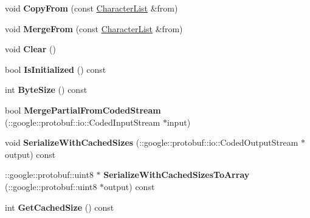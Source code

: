 \begin{DoxyCompactItemize}
\item 
void {\bfseries Copy\+From} (const \hyperlink{classCharacterList}{Character\+List} \&from)\hypertarget{classCharacterList_a562784317ca1d5a8a2f5d2e5c8dd4d91}{}\label{classCharacterList_a562784317ca1d5a8a2f5d2e5c8dd4d91}

\item 
void {\bfseries Merge\+From} (const \hyperlink{classCharacterList}{Character\+List} \&from)\hypertarget{classCharacterList_add64558c620d8c5e8e45dfbd90d4b286}{}\label{classCharacterList_add64558c620d8c5e8e45dfbd90d4b286}

\item 
void {\bfseries Clear} ()\hypertarget{classCharacterList_ad24a5a0cbd565eb9149c08f1decad097}{}\label{classCharacterList_ad24a5a0cbd565eb9149c08f1decad097}

\item 
bool {\bfseries Is\+Initialized} () const \hypertarget{classCharacterList_aed2311adb28f5438cb82a508bd42145a}{}\label{classCharacterList_aed2311adb28f5438cb82a508bd42145a}

\item 
int {\bfseries Byte\+Size} () const \hypertarget{classCharacterList_a4c6f0118b6b28a797f70d015c44d20b5}{}\label{classCharacterList_a4c6f0118b6b28a797f70d015c44d20b5}

\item 
bool {\bfseries Merge\+Partial\+From\+Coded\+Stream} (\+::google\+::protobuf\+::io\+::\+Coded\+Input\+Stream $\ast$input)\hypertarget{classCharacterList_aeb1ceec9c884d8639ea71fe30021bbee}{}\label{classCharacterList_aeb1ceec9c884d8639ea71fe30021bbee}

\item 
void {\bfseries Serialize\+With\+Cached\+Sizes} (\+::google\+::protobuf\+::io\+::\+Coded\+Output\+Stream $\ast$output) const \hypertarget{classCharacterList_a8ae35703c54b7c41078c3a382856226c}{}\label{classCharacterList_a8ae35703c54b7c41078c3a382856226c}

\item 
\+::google\+::protobuf\+::uint8 $\ast$ {\bfseries Serialize\+With\+Cached\+Sizes\+To\+Array} (\+::google\+::protobuf\+::uint8 $\ast$output) const \hypertarget{classCharacterList_a571a94b4fad69030b34364204ba095f6}{}\label{classCharacterList_a571a94b4fad69030b34364204ba095f6}

\item 
int {\bfseries Get\+Cached\+Size} () const \hypertarget{classCharacterList_afccf044b279943d127b9f3b3dda13836}{}\label{classCharacterList_afccf044b279943d127b9f3b3dda13836}


\end{DoxyCompactItemize}
